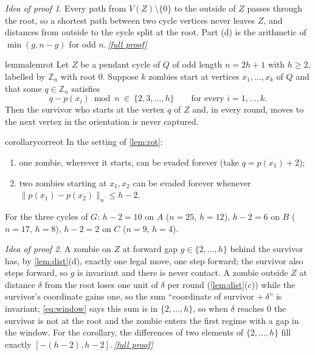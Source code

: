 \documentclass[11pt,a4paper]{article}
\theoremstyle{plain}
\theoremstyle{definition}
\theoremstyle{remark}
\newtheorem*{proofidea}{Idea of proof}
\newcommand{\fullproofref}[1]{\,\hyperref[#1]{\textit{[full proof]}}}
\providecommand{\tightlist}{\setlength{\itemsep}{0pt}\setlength{\parskip}{0pt}}
\newcommand{\Z}{\mathbb Z}
\newcommand{\cyc}[2]{\lVert #1\rVert_{#2}}
\begin{document}
\begin{proofidea}
Every path from $V(Z)\setminus\{0\}$ to the outside of $Z$ passes through the root, so a shortest path between two cycle vertices never leaves $Z$, and distances from outside to the cycle split at the root. Part (d) is the arithmetic of $\min(g,n-g)$ for odd $n$.\fullproofref{pf:dist}
\end{proofidea}

\begin{restatable}{lemma}{lemrot}\label{lem:rot}
Let $Z$ be a pendant cycle of $Q$ of odd length $n=2h+1$ with $h\ge2$, labelled by $\Z_n$ with root $0$. Suppose $k$ zombies start at vertices $x_1,\dots,x_k$ of $Q$ and that some $q\in\Z_n$ satisfies
\begin{equation}\label{eq:window}
q-p(x_i)\bmod n\ \in\ \{2,3,\dots,h\}\qquad\text{for every } i=1,\dots,k .
\end{equation}
Then the survivor who starts at the vertex $q$ of $Z$ and, in every round, moves to the next vertex in the orientation is never captured.
\end{restatable}

\begin{restatable}{corollary}{correot}\label{cor:rot}
In the setting of \cref{lem:rot}:
\begin{enumerate}[label=(\roman*)]\tightlist
\item one zombie, wherever it starts, can be evaded forever (take $q=p(x_1)+2$);
\item two zombies starting at $x_1,x_2$ can be evaded forever whenever $\cyc{p(x_1)-p(x_2)}{n}\le h-2$.
\end{enumerate}
For the three cycles of $G$: $h-2=10$ on $A$ ($n=25$, $h=12$), $h-2=6$ on $B$ ($n=17$, $h=8$), $h-2=2$ on $C$ ($n=9$, $h=4$).
\end{restatable}

\begin{proofidea}
A zombie on $Z$ at forward gap $g\in\{2,\dots,h\}$ behind the survivor has, by \cref{lem:dist}(d), exactly one legal move, one step forward; the survivor also steps forward, so $g$ is invariant and there is never contact. A zombie outside $Z$ at distance $\delta$ from the root loses one unit of $\delta$ per round (\cref{lem:dist}(c)) while the survivor's coordinate gains one, so the sum ``coordinate of survivor $+\ \delta$'' is invariant; \eqref{eq:window} says this sum is in $\{2,\dots,h\}$, so when $\delta$ reaches $0$ the survivor is not at the root and the zombie enters the first regime with a gap in the window. For the corollary, the differences of two elements of $\{2,\dots,h\}$ fill exactly $[-(h-2),h-2]$.\fullproofref{pf:rot}
\end{proofidea}
\end{document}
